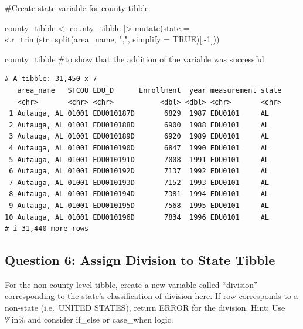 \documentclass[
  letterpaper,
  DIV=11,
  numbers=noendperiod]{scrartcl}
\newenvironment{Shaded}{\begin{snugshade}}{\end{snugshade}}
\newcommand{\AttributeTok}[1]{\textcolor[rgb]{0.40,0.45,0.13}{#1}}
\newcommand{\CommentTok}[1]{\textcolor[rgb]{0.37,0.37,0.37}{#1}}
\newcommand{\ConstantTok}[1]{\textcolor[rgb]{0.56,0.35,0.01}{#1}}
\newcommand{\DecValTok}[1]{\textcolor[rgb]{0.68,0.00,0.00}{#1}}
\newcommand{\FunctionTok}[1]{\textcolor[rgb]{0.28,0.35,0.67}{#1}}
\newcommand{\NormalTok}[1]{\textcolor[rgb]{0.00,0.23,0.31}{#1}}
\newcommand{\OtherTok}[1]{\textcolor[rgb]{0.00,0.23,0.31}{#1}}
\newcommand{\SpecialCharTok}[1]{\textcolor[rgb]{0.37,0.37,0.37}{#1}}
\newcommand{\StringTok}[1]{\textcolor[rgb]{0.13,0.47,0.30}{#1}}
\begin{document}
\begin{Shaded}
\begin{Highlighting}[]
\CommentTok{\#Create state variable for county tibble}

\NormalTok{county\_tibble }\OtherTok{\textless{}{-}}\NormalTok{ county\_tibble }\SpecialCharTok{|\textgreater{}} 
  \FunctionTok{mutate}\NormalTok{(}\AttributeTok{state =} \FunctionTok{str\_trim}\NormalTok{(}\FunctionTok{str\_split}\NormalTok{(area\_name, }\StringTok{","}\NormalTok{, }\AttributeTok{simplify =} \ConstantTok{TRUE}\NormalTok{)[,}\SpecialCharTok{{-}}\DecValTok{1}\NormalTok{]))}

\NormalTok{county\_tibble }\CommentTok{\#to show that the addition of the variable was successful}
\end{Highlighting}
\end{Shaded}

\begin{verbatim}
# A tibble: 31,450 x 7
   area_name   STCOU EDU_D      Enrollment  year measurement state
   <chr>       <chr> <chr>           <dbl> <dbl> <chr>       <chr>
 1 Autauga, AL 01001 EDU010187D       6829  1987 EDU0101     AL   
 2 Autauga, AL 01001 EDU010188D       6900  1988 EDU0101     AL   
 3 Autauga, AL 01001 EDU010189D       6920  1989 EDU0101     AL   
 4 Autauga, AL 01001 EDU010190D       6847  1990 EDU0101     AL   
 5 Autauga, AL 01001 EDU010191D       7008  1991 EDU0101     AL   
 6 Autauga, AL 01001 EDU010192D       7137  1992 EDU0101     AL   
 7 Autauga, AL 01001 EDU010193D       7152  1993 EDU0101     AL   
 8 Autauga, AL 01001 EDU010194D       7381  1994 EDU0101     AL   
 9 Autauga, AL 01001 EDU010195D       7568  1995 EDU0101     AL   
10 Autauga, AL 01001 EDU010196D       7834  1996 EDU0101     AL   
# i 31,440 more rows
\end{verbatim}

\subsection{Question 6: Assign Division to State
Tibble}\label{question-6-assign-division-to-state-tibble}

For the non-county level tibble, create a new variable called
``division'' corresponding to the state's classification of division
\href{https://en.wikipedia.org/wiki/List_of_regions_of_the_United_States}{here.}
If row corresponds to a non-state (i.e.~UNITED STATES), return ERROR for
the division. Hint: Use \%in\% and consider if\_else or case\_when
logic.
\end{document}
